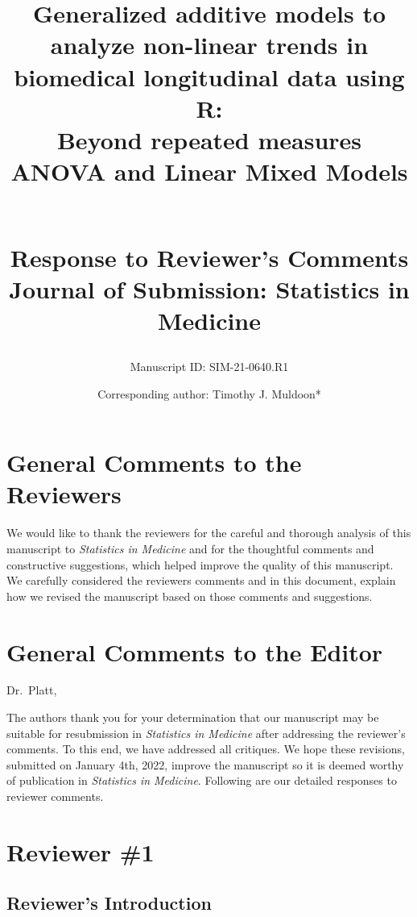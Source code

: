 \documentclass[
]{article}
\author{Corresponding author: Timothy J. Muldoon*}
\affil{Department of Biomedical Engineering, University of Arkansas, Fayetteville, AR, USA}
\affil{tmuldoon@uark.edu}
\title{\textbf{Generalized additive models to analyze non-linear trends in biomedical longitudinal data using R:}\\
Beyond repeated measures ANOVA and Linear Mixed Models\\
\strut \\
\textbf{Response to Reviewer's Comments}\\
Journal of Submission: Statistics in Medicine}
\subtitle{Manuscript ID: SIM-21-0640.R1}
\author{}
\date{\vspace{-2.5em}}
\begin{document}
\maketitle

{
\setcounter{tocdepth}{2}
\tableofcontents
}
\hypertarget{general-comments-to-the-reviewers}{%
\section{General Comments to the Reviewers}\label{general-comments-to-the-reviewers}}

We would like to thank the reviewers for the careful and thorough analysis of this manuscript to \emph{Statistics in Medicine} and for the thoughtful comments and constructive suggestions, which helped improve the quality of this manuscript. We carefully considered the reviewers comments and in this document, explain how we revised the manuscript based on those comments and suggestions.

\hypertarget{general-comments-to-the-editor}{%
\section{General Comments to the Editor}\label{general-comments-to-the-editor}}

Dr.~Platt,

The authors thank you for your determination that our manuscript may be suitable for resubmission in \emph{Statistics in Medicine} after addressing the reviewer's comments. To this end, we have addressed all critiques. We hope these revisions, submitted on January 4th, 2022, improve the manuscript so it is deemed worthy of publication in \emph{Statistics in Medicine}. Following are our detailed responses to reviewer comments.

\hypertarget{reviewer-1}{%
\section{Reviewer \#1}\label{reviewer-1}}

\hypertarget{reviewers-introduction}{%
\subsection{Reviewer's Introduction}\label{reviewers-introduction}}
\end{document}
